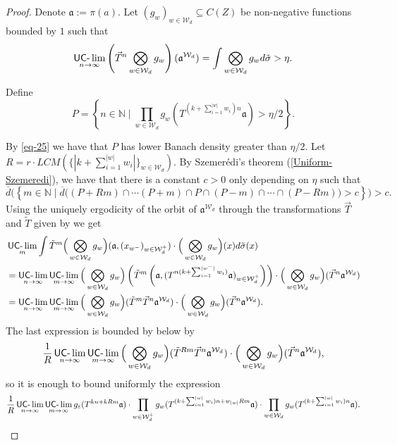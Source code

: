 \documentclass[letter,11pt]{article}
\theoremstyle{definition}
\newcommand{\N}{\mathbb{N}}
\newcommand{\uclim}{\mathop{\textup{\textsf{UC-}}\lim}}
\begin{document}
\begin{proof}
Denote $\mathfrak{a}:=\pi(a)$. Let $(g_w)_{w\in \mathcal{W}_d}\subseteq C(Z)$ be non-negative functions bounded by $1$ such that
\begin{equation}\label{eq-25} 
      \uclim_{n\to \infty} \left(\vec{T}^n\bigotimes_{w\in \mathcal{W}_d}g_w \right)(\mathfrak{a}^{\mathcal{W}_d})=     \int \bigotimes_{w\in \mathcal{W}_d}g_w d\tilde{\sigma}>\eta .
 \end{equation}

Define $$P=\left\{ n\in \N \mid \prod_{w\in \mathcal{W}_d}g_w(T^{(k+\sum_{i=1}^{|w|}w_i)n}\mathfrak{a})>\eta/2 \right\}. $$

By \cref{eq-25} we have that $P$ has lower Banach density greater than $\eta/2$. Let $R=r\cdot LCM(\{|k+\sum_{i=1}^{|w|}w_i |\}_{w\in \mathcal{W}_d})$. By Szemerédi's theorem (\cref{Uniform-Szemeredi}), we have that there is a constant $c>0$ only depending on $\eta$ such that
\begin{equation}\label{eq-26}
     \overline{d}\Big(\left\{m\in \N \mid  \overline{d}\Big((P+Rm)\cap\cdots (P+m)\cap P\cap  (P-m)\cap \cdots\cap (P-Rm)\Big)>c \right\}\Big) >c.
\end{equation}
Using the uniquely ergodicity of the orbit of $\mathfrak{a}^{\mathcal{W}_d}$ through the transformations $\Vec{T}$ and $\tilde{T}$ given by \cite[Theorem 17, Chapter 11]{Host_Kra_nilpotent_structures_ergodic_theory:2018} we get 
\begin{align*}
      & \uclim_{m}\int     \tilde{T}^m \Big( \bigotimes_{w\in \mathcal{W}_d} g_{w}\Big)(\mathfrak{a},  (x_{w^-})_{w\in \mathcal{W}_{d}^{+}})\cdot \Big(\bigotimes_{w\in \mathcal{W}_d}g_{w}  \Big)(x)    d\tilde{\sigma}(x) \\
&= \uclim_{n\to \infty} \uclim_{m\to \infty}  \Big(\bigotimes_{w\in \mathcal{W}_d}g_w\Big)\left(\tilde{T}^m \left(\mathfrak{a}, ( T^{n(k+\sum_{i=1}^{|w^-|}w_i)} \mathfrak{a})_{w\in \mathcal{W}_{d}^{+}}\right)\right)\cdot \Big(\bigotimes_{w\in \mathcal{W}_d}g_w\Big)(\vec{T}^n\mathfrak{a}^{\mathcal{W}_d} )\\
&= \uclim_{n\to \infty} \uclim_{m\to \infty} 
             \Big(\bigotimes_{w\in \mathcal{W}_d}g_w\Big)(\tilde{T}^m\Vec{T}^n \mathfrak{a}^{\mathcal{W}_d} )\cdot  \Big(\bigotimes_{w\in \mathcal{W}_d}g_w\Big)(\vec{T}^n\mathfrak{a}^{\mathcal{W}_d} ) .
\end{align*}
The last expression is bounded by below by
$$ \frac{1}{R} \uclim_{n\to \infty} \uclim_{m\to \infty} 
             \Big(\bigotimes_{w\in \mathcal{W}_d}g_w\Big)(\tilde{T}^{Rm}\Vec{T}^n \mathfrak{a}^{\mathcal{W}_d} )\cdot  \Big(\bigotimes_{w\in \mathcal{W}_d}g_w\Big)(\vec{T}^n\mathfrak{a}^{\mathcal{W}_d} ),$$
so it is enough to bound uniformly the expression
$$\frac{1}{R} \uclim_{n\to \infty} \uclim_{m\to \infty} 
           g_\varepsilon(T^{kn+kRm}\mathfrak{a})\cdot  \prod_{w\in \mathcal{W}_d^{+}} g_{w}(T^{(k+\sum_{i=1}^{|w|}w_i)n+w_{|w|}Rm}\mathfrak{a}) \cdot \prod_{w\in \mathcal{W}_d}g_w(T^{(k+\sum_{i=1}^{|w|}w_i)n}\mathfrak{a}).$$


\end{proof}
\end{document}
